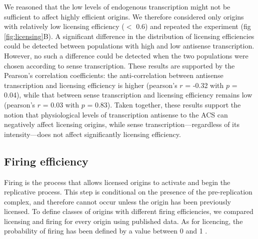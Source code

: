 We reasoned that the low levels of endogenous transcription might not be sufficient to affect highly efficient origins. We therefore considered only origins with relatively low licensing efficiency ($<$ 0.6) and repeated the experiment (fig \ref{fig:licensing}B). 
A significant difference in the distribution of licensing efficiencies could be detected between populations with high and low antisense transcription. 
However, no such a difference could be detected when the two populations were chosen according to sense transcription. 
These results are supported by the Pearson’s correlation coefficients: the anti-correlation between antisense transcription and licensing efficiency is higher (pearson’s $r$ = -0.32 with $p$ = 0.04), while that between sense transcription and licensing efficiency remains low (pearson’s $r$ = 0.03 with $p$ = 0.83). 
Taken together, these results support the notion that physiological levels of transcription antisense to the ACS can negatively affect licensing origins, while sense transcription—regardless of its intensity—does not affect significantly licensing efficiency.



\subsection{Firing efficiency}

Firing is the process that allows licensed origins to activate and begin the replicative process. This step is conditional on the presence of the pre-replication complex, and therefore cannot occur unless the origin has been previously licensed. To define classes of origins with different firing efficiencies, we compared licensing and firing for every origin using published data. As for licencing, the probability of firing has been defined by a value between 0 and 1 \cite{hawkins:2013:highresolution}.

